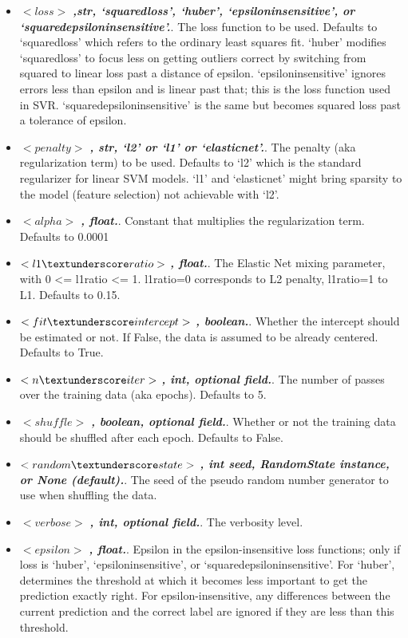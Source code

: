 \begin{itemize}
  \item $<loss>$ \textbf{\textit{,str, ‘squared\textunderscore loss’, ‘huber’, ‘epsilon\textunderscore insensitive’, or ‘squared\textunderscore epsilon\textunderscore insensitive’.}}. The loss function to be used. Defaults to ‘squared\textunderscore loss’ which refers to the ordinary least squares fit. ‘huber’ modifies ‘squared\textunderscore loss’ to focus less on getting outliers correct by switching from squared to linear loss past a distance of epsilon. ‘epsilon\textunderscore insensitive’ ignores errors less than epsilon and is linear past that; this is the loss function used in SVR. ‘squared\textunderscore epsilon\textunderscore insensitive’ is the same but becomes squared loss past a tolerance of epsilon.
  \item $<penalty>$ \textbf{\textit{, str, ‘l2’ or ‘l1’ or ‘elasticnet’.}}. The penalty (aka regularization term) to be used. Defaults to ‘l2’ which is the standard regularizer for linear SVM models. ‘l1’ and ‘elasticnet’ might bring sparsity to the model (feature selection) not achievable with ‘l2’.
  \item $<alpha>$ \textbf{\textit{, float.}}. Constant that multiplies the regularization term. Defaults to 0.0001
  \item $<l1\textunderscore ratio>$ \textbf{\textit{, float.}}. The Elastic Net mixing parameter, with 0 <= l1\textunderscore ratio <= 1. l1\textunderscore ratio=0 corresponds to L2 penalty, l1\textunderscore ratio=1 to L1. Defaults to 0.15.
  \item $<fit\textunderscore intercept>$ \textbf{\textit{, boolean.}}. Whether the intercept should be estimated or not. If False, the data is assumed to be already centered. Defaults to True.
  \item $<n\textunderscore iter>$ \textbf{\textit{, int, optional field.}}. The number of passes over the training data (aka epochs). Defaults to 5.
  \item $<shuffle>$ \textbf{\textit{, boolean, optional field.}}. Whether or not the training data should be shuffled after each epoch. Defaults to False.
  \item $<random\textunderscore state>$ \textbf{\textit{, int seed, RandomState instance, or None (default).}}. The seed of the pseudo random number generator to use when shuffling the data.
  \item $<verbose>$ \textbf{\textit{, int, optional field.}}. The verbosity level.
  \item $<epsilon>$ \textbf{\textit{, float.}}. Epsilon in the epsilon-insensitive loss functions; only if loss is ‘huber’, ‘epsilon\textunderscore insensitive’, or ‘squared\textunderscore epsilon\textunderscore insensitive’. For ‘huber’, determines the threshold at which it becomes less important to get the prediction exactly right. For epsilon-insensitive, any differences between the current prediction and the correct label are ignored if they are less than this threshold.

\end{itemize}

